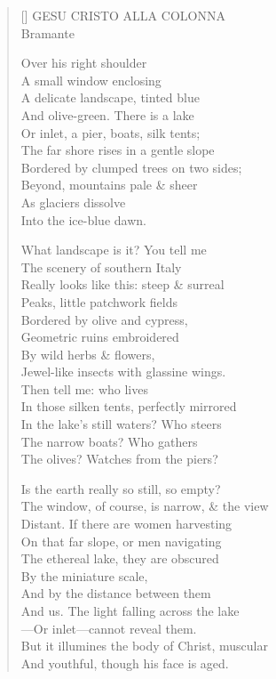 \label{ch:milano_pinocoteca_brera}
\settowidth{\versewidth}{The window, of course, is narrow, \& the view}
\begin{verse}[\versewidth]
GESU CRISTO ALLA COLONNA\\
Bramante

Over his right shoulder\\
A small window enclosing\\
A delicate landscape, tinted blue\\
And olive-green.     There is a lake\\
Or inlet, a pier, boats, silk tents;\\
The far shore rises in a gentle slope\\
Bordered by clumped trees on two sides;\\
Beyond, mountains pale \& sheer\\
As glaciers dissolve\\
Into the ice-blue dawn.

What landscape is it?  You tell me\\
The scenery of southern Italy\\
Really looks like this: steep \& surreal\\
Peaks, little patchwork fields\\
Bordered by olive and cypress,\\
Geometric ruins embroidered\\
By wild herbs \& flowers,\\
Jewel-like insects with glassine wings.\\
Then tell me: who lives\\
In those silken tents, perfectly mirrored\\
In the lake's still waters?  Who steers\\
The narrow boats?  Who gathers\\
The olives?  Watches from the piers?

Is the earth really so still, so empty?\\
The window, of course, is narrow, \& the view\\
Distant. If there are women harvesting\\
On that far slope, or men navigating\\
The ethereal lake, they are obscured\\
By the miniature scale,\\
And by the distance between them\\
And us.   The light falling across the lake\\
---Or inlet---cannot reveal them.\\
But it illumines the body of Christ, muscular\\
And youthful, though his face is aged.


\end{verse}
